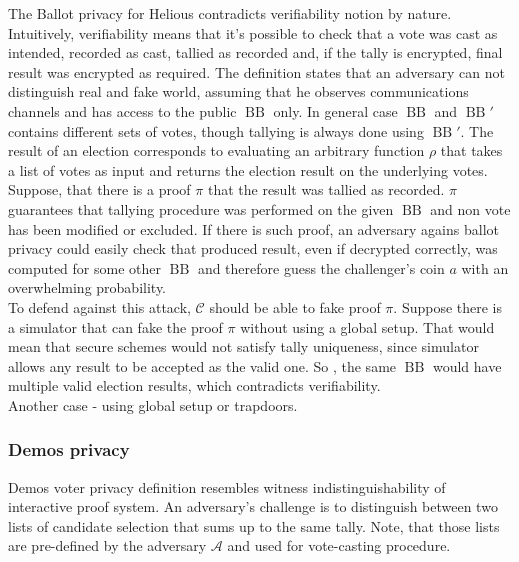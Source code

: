 \documentclass[12pt]{article}
\DeclareMathOperator{\bb}{BB}
\begin{document}
The Ballot privacy for Helious contradicts verifiability notion by nature. Intuitively, verifiability means that it's possible to check that a vote was cast as intended, recorded as cast, tallied as recorded and, if the tally is encrypted, final result was encrypted as required. The definition states that an adversary can not distinguish real and fake world, assuming that he observes communications channels and has access to the public $\bb$ only. In general case $\bb$ and $\bb'$ contains different sets of votes, though tallying is always done using $\bb'$. The result of an election corresponds to evaluating an arbitrary function $\rho$ that takes a list of votes as input and returns the election result on the underlying votes. Suppose, that there is a proof $\pi$ that the result was tallied as recorded. $\pi$ guarantees that tallying procedure was performed on the given $\bb$ and non vote has been modified or excluded. If there is such proof, an adversary agains ballot privacy could easily check that produced result, even if decrypted correctly, was computed for some other $\bb$ and therefore guess the challenger's coin $a$ with an overwhelming probability. \\

To defend against this attack, $\mathcal{C}$ should be able to fake proof $\pi$. Suppose there is a simulator that can fake the proof $\pi$ without using a global setup. That would mean that secure schemes would not satisfy tally uniqueness, since simulator allows any result to be accepted as the valid one. So , the same $\bb$ would have multiple valid election results, which contradicts verifiability. \\ 

Another case - using global setup or trapdoors. 

 \subsubsection{Demos privacy}
 Demos voter privacy definition resembles witness indistinguishability of interactive proof system. An adversary's challenge is to distinguish between two lists of candidate selection that sums up to the same tally. Note, that those lists are pre-defined by the adversary  $\mathcal{A}$ and used for vote-casting procedure. \\
 
\end{document}
